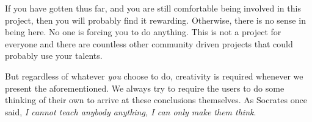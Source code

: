 If you have gotten thus far, and you are still comfortable being involved in this project, then you will probably find it rewarding. Otherwise, there is no sense in being here. No one is forcing you to do anything. This is not a project for everyone and there are countless other community driven projects that could probably use your talents.

But regardless of whatever {\it you} choose to do, creativity is required whenever we present the aforementioned. We always try to require the users to do some thinking of their own to arrive at these conclusions themselves. As Socrates once said, {\it I cannot teach anybody anything, I can only make them think}.

\StopChapter

